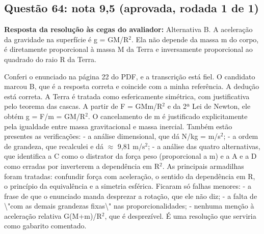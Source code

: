 \documentclass{article}%
\begin{document}
\subsection*{Questão 64: nota 9,5 (aprovada, rodada 1 de 1)}%
\textbf{Resposta da resolução às cegas do avaliador:} Alternativa B. A aceleração da gravidade na superfície é g = GM/R$^2$. Ela não depende da massa m do corpo, é diretamente proporcional à massa M da Terra e inversamente proporcional ao quadrado do raio R da Terra.\par %
Conferi o enunciado na página 22 do PDF, e a transcrição está fiel. O candidato marcou B, que é a resposta correta e coincide com a minha referência.\newline%
\newline%
A dedução está correta. A Terra é tratada como esfericamente simétrica, com justificativa pelo teorema das cascas. A partir de F = GMm/R$^2$ e da 2ª Lei de Newton, ele obtém g = F/m = GM/R$^2$. O cancelamento de m é justificado explicitamente pela igualdade entre massa gravitacional e massa inercial.\newline%
\newline%
Também estão presentes as verificações:\newline%
{-} a análise dimensional, que dá N/kg = m/s$^2$;\newline%
{-} a ordem de grandeza, que recalculei e dá $\approx$ 9,81 m/s$^2$;\newline%
{-} a análise das quatro alternativas, que identifica a C como o distrator da força peso (proporcional a m) e a A e a D como erradas por inverterem a dependência em R$^2$.\newline%
\newline%
As principais armadilhas foram tratadas: confundir força com aceleração, o sentido da dependência em R, o princípio da equivalência e a simetria esférica. Ficaram só falhas menores:\newline%
{-} a frase de que o enunciado manda desprezar a rotação, que ele não diz;\newline%
{-} a falta de \textbackslash{}"com as demais grandezas fixas\textbackslash{}" nas proporcionalidades;\newline%
{-} nenhuma menção à aceleração relativa G(M+m)/R$^2$, que é desprezível.\newline%
\newline%
É uma resolução que serviria como gabarito comentado.%
\end{document}
